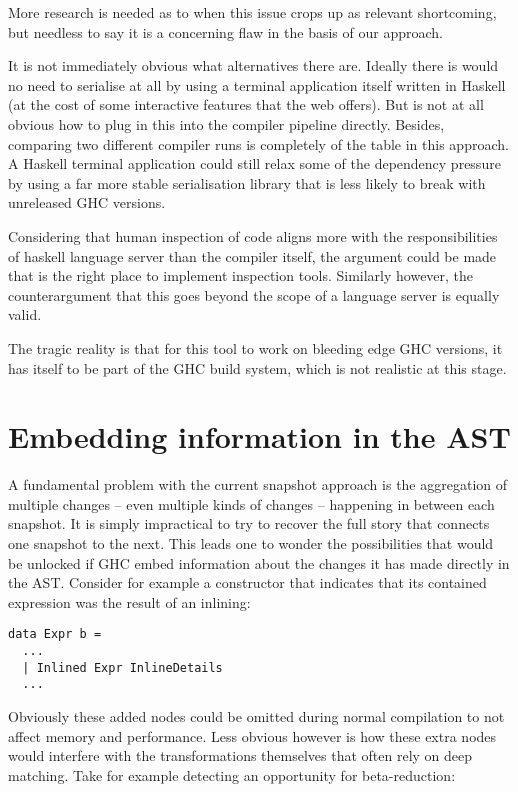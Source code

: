 More research is needed as to when this issue crops up as relevant shortcoming, but needless to say it is a concerning flaw in the
basis of our approach.

It is not immediately obvious what alternatives there are. Ideally there is would no need to serialise at all by using a terminal application
itself written in Haskell (at the cost of some interactive features that the web offers). But is not at all obvious how to plug in this into the
compiler pipeline directly. Besides, comparing two different compiler runs is completely of the table in this approach. A Haskell terminal application could
still relax some of the dependency pressure by using a far more stable serialisation library that is less likely to break with unreleased GHC versions.

Considering that human inspection of code aligns more with the responsibilities of haskell language server than the compiler itself, the argument
could be made that  is the right place to implement inspection tools. Similarly however, the counterargument that this goes beyond
the scope of a language server is equally valid. 

The tragic reality is that for this tool to work on bleeding edge GHC versions, it has itself to be part of the GHC build system, which is not
realistic at this stage.

\section{Embedding information in the AST}
A fundamental problem with the current snapshot approach is the aggregation of multiple changes -- even multiple kinds of changes -- happening in between
each snapshot. It is simply impractical to try to recover the full story that connects one snapshot to the next. This leads one to wonder the possibilities
that would be unlocked if GHC embed information about the changes it has made directly in the AST. Consider for example a constructor that indicates
that its contained expression was the result of an inlining:

\begin{listing}[H]
\begin{verbatim}
data Expr b = 
  ...
  | Inlined Expr InlineDetails
  ...
\end{verbatim}
\end{listing}

Obviously these added nodes could be omitted during normal compilation to not affect memory and performance. Less obvious however is how these extra
nodes would interfere with the transformations themselves that often rely on deep matching. Take for example detecting an opportunity for beta-reduction:

